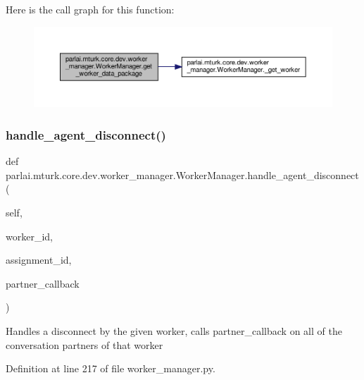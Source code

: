 Here is the call graph for this function\+:
\nopagebreak
\begin{figure}[H]
\begin{center}
\leavevmode
\includegraphics[width=350pt]{classparlai_1_1mturk_1_1core_1_1dev_1_1worker__manager_1_1WorkerManager_a25fea0a63f8cb6ba522162e7e219e945_cgraph}
\end{center}
\end{figure}
\mbox{\label{classparlai_1_1mturk_1_1core_1_1dev_1_1worker__manager_1_1WorkerManager_aaeb48ce35a7793d501d2a317ea225526}} 
\subsubsection{\texorpdfstring{handle\+\_\+agent\+\_\+disconnect()}{handle\_agent\_disconnect()}}
{\footnotesize\ttfamily def parlai.\+mturk.\+core.\+dev.\+worker\+\_\+manager.\+Worker\+Manager.\+handle\+\_\+agent\+\_\+disconnect (\begin{DoxyParamCaption}\item[{}]{self,  }\item[{}]{worker\+\_\+id,  }\item[{}]{assignment\+\_\+id,  }\item[{}]{partner\+\_\+callback }\end{DoxyParamCaption})}

\begin{DoxyVerb}Handles a disconnect by the given worker, calls partner_callback
on all of the conversation partners of that worker
\end{DoxyVerb}
 

Definition at line 217 of file worker\+\_\+manager.\+py.



